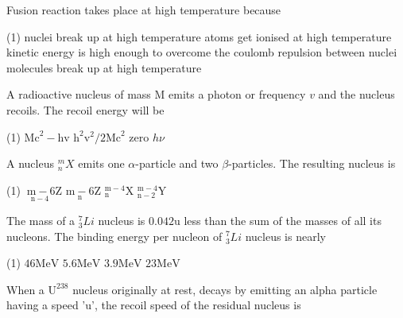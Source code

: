 \begin{enumerate}[ label=\color{ocre}\textbf{\arabic*.}]
\begin{minipage}{\textwidth}
	\item Fusion reaction takes place at high temperature because 
\end{minipage}
\begin{tasks}(1)
	\task[\textbf{A.}] nuclei break up at high temperature
	\task[\textbf{B.}] atoms get ionised at high temperature
	\task[\textbf{C.}]kinetic energy is high enough to overcome the coulomb repulsion between nuclei
	\task[\textbf{D.}] molecules break up at high temperature
\end{tasks}
\begin{minipage}{\textwidth}
	\item A radioactive nucleus of mass $\mathrm{M}$ emits a photon or frequency $v$ and the nucleus recoils. The recoil energy will be
\end{minipage}
\begin{tasks}(1)
	\task[\textbf{A.}] $\mathrm{Mc}^{2}-\mathrm{hv}$ 
	\task[\textbf{B.}] $\mathrm{h}^{2} \mathrm{v}^{2} / 2 \mathrm{Mc}^{2}$
	\task[\textbf{C.}]zero
	\task[\textbf{D.}]$h\nu$
\end{tasks}
\begin{minipage}{\textwidth}
	\item A nucleus ${ }_{n}^{m} X$ emits one $\alpha$-particle and two $\beta$-particles. The resulting nucleus is
\end{minipage}
\begin{tasks}(1)
	\task[\textbf{A.}] $\underset{\mathrm{n}-4}{\mathrm{~m}-6} \mathrm{Z}$
	\task[\textbf{B.}] $\underset{\mathrm{n}}{\mathrm{m}-6} \mathrm{Z}$
	\task[\textbf{C.}]${ }_{\mathrm{n}}^{\mathrm{m}-4} \mathrm{X}$
	\task[\textbf{D.}]${ }_{\mathrm{n}-2}^{\mathrm{m}-4} \mathrm{Y}$
\end{tasks}
\begin{minipage}{\textwidth}
	\item The mass of a ${ }_{3}^{7} L i$ nucleus is $0.042 \mathrm{u}$ less than the sum of the masses of all its nucleons. The binding energy per nucleon of ${ }_{3}^{7} L i$ nucleus is nearly
\end{minipage}
\begin{tasks}(1)
	\task[\textbf{A.}]$46 \mathrm{MeV}$
	\task[\textbf{B.}] $5.6 \mathrm{MeV}$
	\task[\textbf{C.}]$3.9 \mathrm{MeV}$
	\task[\textbf{D.}]$23 \mathrm{MeV}$ 
\end{tasks}
\begin{minipage}{\textwidth}
	\item When a $\mathrm{U}^{238}$ nucleus originally at rest, decays by emitting an alpha particle having a speed 'u', the recoil speed of the residual nucleus is

\end{minipage}
\end{enumerate}
